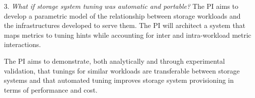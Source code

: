 \begin{myitemize}



\item[3.]
\emph{What if storage system tuning was automatic and portable?} The PI aims to develop a
parametric model of the relationship between storage workloads and the
infrastructures developed to serve them.  %
The PI will architect a system that maps metrics to tuning hints while accounting for inter and intra-workload metric interactions.  

The PI aims to
demonstrate, both analytically and through experimental validation, that tunings for similar workloads are transferable between storage
systems and that automated tuning improves storage system provisioning in terms of performance and cost.
  



\end{myitemize}
